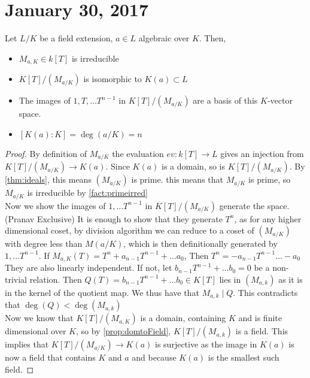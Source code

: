 \section{January 30, 2017}
\begin{prop}
    Let $L / K$ be a field extension, $a \in L$ algebraic over $K$. Then,
    \begin{itemize}
        \item $M_{a,K} \in k[T]$ is irreducible
        \item $K[T] / (M_{a/K})$ is isomorphic to $K(a) \subset L$
        \item The images of $1, T, \dots T^{n-1}$ in $K[T] / (M_{a/K})$ are a
        basis of this $K$-vector space.
        \item $[K(a) : K] = \deg(a/K) = n$
    \end{itemize}
\end{prop}
\begin{proof}
    By definition of $M_{a/K}$ the evaluation $ev: k[T] \rightarrow L$ gives an
    injection from $K[T] / (M_{a/K}) \rightarrow K(a)$. Since $K(a)$ is a domain,
    so is $K[T] / (M_{a/K})$. By \ref{thm:ideals}, this means $(M_{a/K})$ is prime.
    this means that $M_{a/K}$ is prime, so $M_{a/K}$ is irreducible by \ref{fact:primeirred} \\
    Now we show the images of $1, \dots T^{n-1}$ in $K[T] / (M_{a/K})$ generate the space.
    (Pranav Exclusive) It is enough to show that they generate $T^n$, as for any higher
    dimensional coset, by division algorithm we can reduce to a coset of $(M_{a/K})$ with
    degree less than $M(a/K)$, which is then definitionally generated by $1, \dots T^{n-1}$.
    If $M_{a,K}(T) = T^n + a_{n-1}T^{n-1} + \dots a_0$, Then $T^n = -a_{n-1}T^{n-1} \dots -a_0$
    They are also linearly independent. If not, let $b_{n-1}T^{n-1} + \dots b_0 = 0$
    be a non-trivial relation. Then $Q(T) = b_{n-1}T^{n-1} + \dots b_0 \in K[T]$ lies
    in $(M_{a,k})$ as it is in the kernel of the quotient map. We thus have that
    $M_{a,k} \mid Q$. This contradicts that $\deg(Q) < \deg(M_{a,k})$ \\
    Now we know that $K[T] / (M_{a,K})$ is a domain, containing $K$ and is finite
    dimensional over $K$, so by \ref{prop:domtoField}, $K[T] / (M_{a,k})$ is a field.
    This implies that $K[T] / (M_{a/K}) \rightarrow K(a)$ is surjective as the image
    in $K(a)$ is now a field that contains $K$ and $a$ and because $K(a)$ is the smallest
    such field.
\end{proof}

